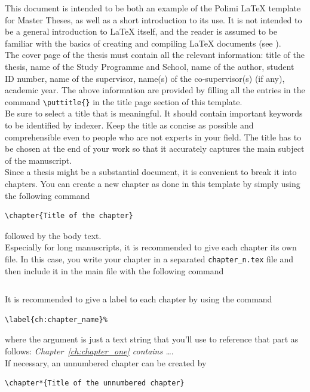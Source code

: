 \documentclass{report}
\begin{document}
This document is intended to be both an example of the Polimi \LaTeX{} template for Master Theses,
as well as a short introduction to its use. It is not intended to be a general introduction to \LaTeX{} itself,
and the reader is assumed to be familiar with the basics of creating and compiling \LaTeX{} documents (see \cite{oetiker1995not, kottwitz2015latex}). 
\\
The cover page of the thesis must contain all the relevant information:
title of the thesis, name of the Study Programme and School, name of the author,
student ID number, name of the supervisor, name(s) of the co-supervisor(s) (if any), academic year.
The above information are provided by filling all the entries in the command \verb|\puttitle{}|
in the title page section of this template.
\\
Be sure to select a title that is meaningful.
It should contain important keywords to be identified by indexer.
Keep the title as concise as possible and comprehensible even to people who are not experts in your field.
The title has to be chosen at the end of your work so that it accurately captures the main subject of the manuscript. 
\\
Since a thesis might be a substantial document, it is convenient to break it into chapters.
You can create a new chapter as done in this template by simply using the following command
\begin{verbatim}
\chapter{Title of the chapter}
\end{verbatim}
followed by the body text.
\\
Especially for long manuscripts, it is recommended to give each chapter its own file.
In this case, you write your chapter in a separated \verb|chapter_n.tex| file
and then include it in the main file with the following command
\begin{verbatim}

\end{verbatim}
It is recommended to give a label to each chapter by using the command
\begin{verbatim}
\label{ch:chapter_name}%
\end{verbatim}
where the argument is just a text string that you'll use to reference that part
as follows: \textit{Chapter~\ref{ch:chapter_one} contains   \dots}.\\
If necessary, an unnumbered chapter can be created by
\begin{verbatim}
\chapter*{Title of the unnumbered chapter}
\end{verbatim}
\end{document}
